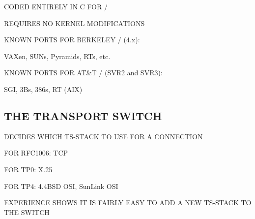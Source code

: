 \begin{bwslide}

\begin{nrtc}
\item	CODED ENTIRELY IN C FOR \unix/
    \begin{nrtc}
    \item	REQUIRES NO KERNEL MODIFICATIONS    
    \end{nrtc}

\item	KNOWN PORTS FOR BERKELEY \unix/ (4.x):
    \begin{nrtc}
    \item	VAXen, SUNs, Pyramids, RTs, etc.
    \end{nrtc}

\item	KNOWN PORTS FOR AT\&T \unix/ (SVR2 and SVR3):
    \begin{nrtc}
    \item	SGI, 3Bs, 386s, RT (AIX)
    \end{nrtc}
\end{nrtc}
\end{bwslide}


\begin{bwslide}
\part*	{THE TRANSPORT SWITCH}\bf

\begin{nrtc}
\item	DECIDES WHICH TS-STACK TO USE FOR A CONNECTION

\item	FOR RFC1006: TCP

\item	FOR TP0: X.25

\item	FOR TP4: 4.4BSD OSI, SunLink OSI

\item	EXPERIENCE SHOWS IT IS FAIRLY EASY TO ADD A NEW TS-STACK TO THE SWITCH
\end{nrtc}
\end{bwslide}






